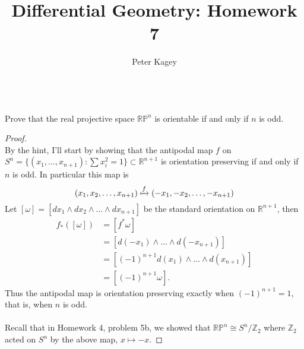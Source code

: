 \documentclass{article}
\newenvironment{problem}[2][Problem]{\begin{trivlist}
\item[\hskip \labelsep {\bfseries #1}\hskip \labelsep {\bfseries #2.}]}{\end{trivlist}}
\begin{document}
\title{Differential Geometry: Homework 7}
\author{Peter Kagey}

\maketitle

\begin{problem}{1} \text{} \\
  Prove that the real projective space $\mathbb{RP}^n$ is orientable if and only
  if $n$ is odd.
\end{problem}

\begin{proof} \text{} \\
  By the hint, I'll start by showing that the antipodal map $f$ on
  $S^n = \{(x_1, \hdots, x_{n+1}) : \sum x_i^2 = 1 \}\subset \mathbb{R}^{n+1}$ is orientation preserving if and only if $n$ is
  odd. In particular this map is \[
    (x_1, x_2, \hdots, x_{n+1}) \xmapsto{f} (-x_1, -x_2, \hdots, -x_{n+1})
  \]
  Let $[\omega] = [dx_1 \wedge dx_2 \wedge \hdots \wedge dx_{n+1}]$ be the standard
  orientation on $\mathbb{R}^{n+1}$, then \begin{align*}
    f_*([\omega])
      &= [f^*\omega] \\
      &= [d(-x_1) \wedge \hdots \wedge d(-x_{n+1})] \\
      &= [(-1)^{n+1} d(x_1) \wedge \hdots \wedge d(x_{n+1})] \\
      &= [(-1)^{n+1} \omega].
  \end{align*} Thus the antipodal map is orientation preserving exactly when
  $(-1)^{n+1} = 1$, that is, when $n$ is odd.
  \\~\\
  Recall that in Homework 4, problem 5b, we showed that $\mathbb{RP}^n \cong S^n/\mathbb{Z}_2$
  where $\mathbb{Z}_2$ acted on $S^n$ by the above map, $x \mapsto -x$.
\end{proof}
\pagebreak
\end{document}
